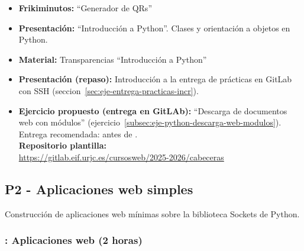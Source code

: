 \documentclass[a4paper,12pt]{article}
\begin{document}
\begin{itemize}
\item \textbf{Frikiminutos:} ``Generador de QRs''
\item \textbf{Presentación:} ``Introducción a Python''. Clases y orientación a objetos en Python.
\item \textbf{Material:} Transparencias ``Introducción a Python''
\item \textbf{Presentación (repaso):} Introducción a la entrega de prácticas en GitLab con SSH (seccion~\ref{sec:eje-entrega-practicas-incr}).
\item \textbf{Ejercicio propuesto (entrega en GitLAb):} ``Descarga de documentos web con módulos'' (ejercicio~\ref{subsec:eje-python-descarga-web-modulos}). \\
Entrega recomendada: antes de \juevesD. \\
\textbf{Repositorio plantilla:} \\
\url{https://gitlab.eif.urjc.es/cursosweb/2025-2026/cabeceras}
\end{itemize}



\subsection{P2 - Aplicaciones web simples}


Construcción de aplicaciones web mínimas sobre la biblioteca Sockets de Python.


\subsubsection{\juevesD: Aplicaciones web (2 horas)}
\label{cal:juevesD}
\end{document}
